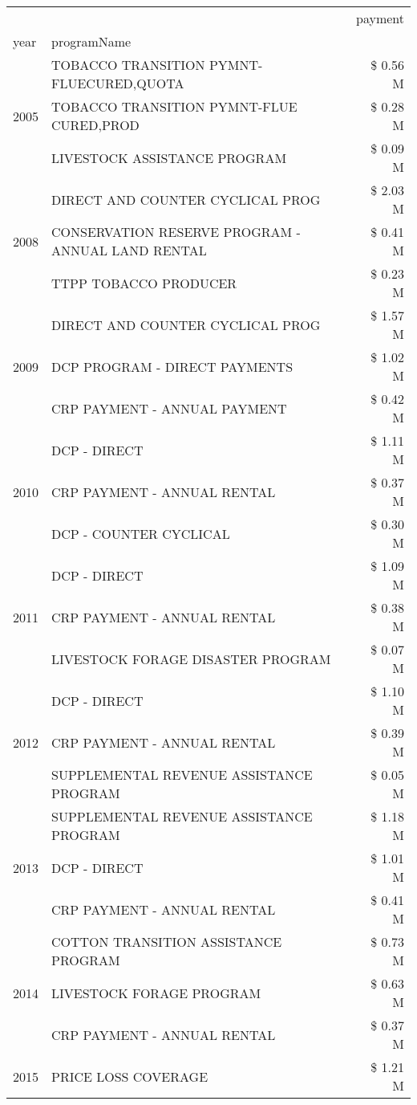 \begin{tabular}{llr}
\toprule
 &  & payment \\
year & programName &  \\
\midrule
\multirow[t]{3}{*}{2005} & TOBACCO TRANSITION PYMNT-FLUECURED,QUOTA & \$ 0.56 M \\
 & TOBACCO TRANSITION PYMNT-FLUE CURED,PROD & \$ 0.28 M \\
 & LIVESTOCK ASSISTANCE PROGRAM & \$ 0.09 M \\
\cline{1-3}
\multirow[t]{3}{*}{2008} & DIRECT AND COUNTER CYCLICAL PROG & \$ 2.03 M \\
 & CONSERVATION RESERVE PROGRAM - ANNUAL LAND RENTAL & \$ 0.41 M \\
 & TTPP TOBACCO PRODUCER & \$ 0.23 M \\
\cline{1-3}
\multirow[t]{3}{*}{2009} & DIRECT AND COUNTER CYCLICAL PROG & \$ 1.57 M \\
 & DCP PROGRAM - DIRECT PAYMENTS & \$ 1.02 M \\
 & CRP PAYMENT - ANNUAL PAYMENT & \$ 0.42 M \\
\cline{1-3}
\multirow[t]{3}{*}{2010} & DCP - DIRECT & \$ 1.11 M \\
 & CRP PAYMENT - ANNUAL RENTAL & \$ 0.37 M \\
 & DCP - COUNTER CYCLICAL & \$ 0.30 M \\
\cline{1-3}
\multirow[t]{3}{*}{2011} & DCP - DIRECT & \$ 1.09 M \\
 & CRP PAYMENT - ANNUAL RENTAL & \$ 0.38 M \\
 & LIVESTOCK FORAGE DISASTER PROGRAM & \$ 0.07 M \\
\cline{1-3}
\multirow[t]{3}{*}{2012} & DCP - DIRECT & \$ 1.10 M \\
 & CRP PAYMENT - ANNUAL RENTAL & \$ 0.39 M \\
 & SUPPLEMENTAL REVENUE ASSISTANCE PROGRAM & \$ 0.05 M \\
\cline{1-3}
\multirow[t]{3}{*}{2013} & SUPPLEMENTAL REVENUE ASSISTANCE PROGRAM & \$ 1.18 M \\
 & DCP - DIRECT & \$ 1.01 M \\
 & CRP PAYMENT - ANNUAL RENTAL & \$ 0.41 M \\
\cline{1-3}
\multirow[t]{3}{*}{2014} & COTTON TRANSITION ASSISTANCE PROGRAM & \$ 0.73 M \\
 & LIVESTOCK FORAGE PROGRAM & \$ 0.63 M \\
 & CRP PAYMENT - ANNUAL RENTAL & \$ 0.37 M \\
\cline{1-3}
\multirow[t]{3}{*}{2015} & PRICE LOSS COVERAGE & \$ 1.21 M \\

\end{tabular}
